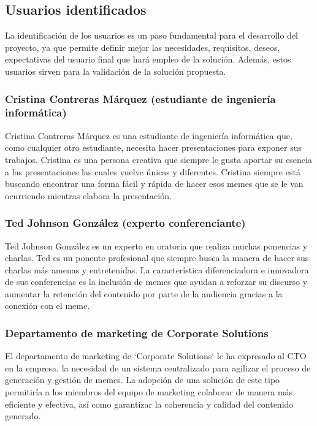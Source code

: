 \subsection{Usuarios identificados}

    La identificación de los usuarios es un paso fundamental para el desarrollo del proyecto, ya que permite definir mejor las necesidades, requisitos, deseos, expectativas del usuario final que hará empleo de la solución. Además, estos usuarios sirven para la validación de la solución propuesta.

    \subsubsection{Cristina Contreras Márquez (estudiante de ingeniería informática)}

    Cristina Contreras Márquez es una estudiante de ingeniería informática que, como cualquier otro estudiante, necesita hacer presentaciones para exponer sus trabajos. Cristina es una persona creativa que siempre le gusta aportar su esencia a las presentaciones las cuales vuelve únicas y diferentes. Cristina siempre está buscando encontrar una forma fácil y rápida de hacer esos memes que se le van ocurriendo mientras elabora la presentación.

    \subsubsection{Ted Johnson González (experto conferenciante)}

    Ted Johnson González es un experto en oratoria que realiza muchas ponencias y charlas. Ted es un ponente profesional que siempre busca la manera de hacer sus charlas más amenas y entretenidas. La característica diferenciadora e innovadora de sus conferencias es la inclusión de memes que ayudan a reforzar su discurso y aumentar la retención del contenido por parte de la audiencia gracias a la conexión con el meme.

    \subsubsection{Departamento de marketing de Corporate Solutions}

    El departamento de marketing de `Corporate Solutions` le ha expresado al CTO en la empresa, la necesidad de un sistema centralizado para agilizar el proceso de generación y gestión de memes. La adopción de una solución de este tipo permitiría a los miembros del equipo de marketing colaborar de manera más eficiente y efectiva, así como garantizar la coherencia y calidad del contenido generado. 

